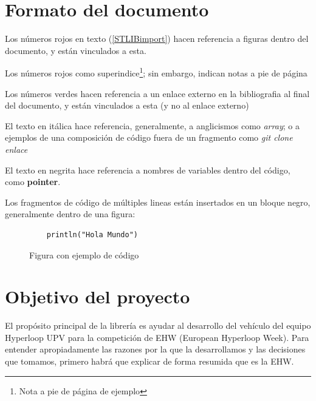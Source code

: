 \documentclass{report}
\begin{document}
\newpage

\section{Formato del documento}
Los números rojos en texto (\ref{STLIBimport}) hacen referencia a figuras dentro del documento, y están vinculados a esta.
\par \vspace{0.5 cm}
Los números rojos como superindice\footnote{Nota a pie de página de ejemplo}; sin embargo, indican notas a pie de página 
\par \vspace{0.5 cm}
Los números verdes \cite{web:github:STLIB} hacen referencia a un enlace externo en la bibliografia al final del documento, y están vinculados a esta (y no al enlace externo)
\par \vspace{0.5 cm}
El texto en itálica hace referencia, generalmente, a anglicismos como \textit{array}; o a ejemplos de una composición de código fuera de un fragmento como \textit{git clone enlace}
\par \vspace{0.5 cm}
El texto en negrita hace referencia a nombres de variables dentro del código, como \textbf{pointer}.
\par \vspace{0.5 cm}
Los fragmentos de código de múltiples lineas están insertados en un bloque negro, generalmente dentro de una figura:
\begin{figure}[h]
  \begin{lstlisting}
    println("Hola Mundo")
  \end{lstlisting}
\caption{Figura con ejemplo de código}
\label{FormatFigureExample}
\end{figure}

\setlength{\parindent}{15pt}
\newpage

\section{Objetivo del proyecto}
El propósito principal de la librería es ayudar al desarrollo del vehículo del equipo Hyperloop UPV para la competición de EHW (European Hyperloop Week). Para entender apropiadamente las razones por la que la desarrollamos y las decisiones que tomamos, primero habrá que explicar de forma resumida que es la EHW. \cite{web:EHW:homepage} 
\par \vspace{0.3 cm}
\end{document}
